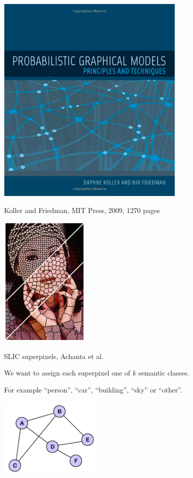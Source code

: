 {\centerline{\includegraphics[height = 4in]{../images/Koller}}
\centerline{Koller and Friedman, MIT Press, 2009, 1270 pages}

\centerline{\includegraphics[height = 2.5in]{../images/SLICcolor}}
\centerline{\huge SLIC superpixels, Achanta et al.}

\vfill
We want to assign each superpixel one of $k$ semantic classes.

\vfill
For example ``person'', ``car'', ``building'', ``sky'' or ``other''.



\centerline{\includegraphics[height= 1.5in]{../images/Graph}}

}
